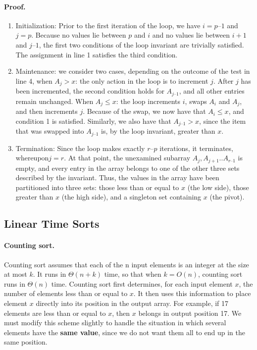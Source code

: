 \paragraph{Proof.}
\begin{enumerate}
  \item Initialization: Prior to the first iteration of the loop, we have $i = p – 1$ and $ j= p$. Because no values lie between $p$ and $i$ and no values lie between $i + 1$ and $j – 1$, the first two conditions of the loop invariant are trivially satisfied. The assignment in line 1 satisfies the third condition.
  \item Maintenance: we consider two cases, depending on the outcome of the test in line 4, when $A_{j} > x$: the only action in the loop is to increment $j$. After $j$  has been incremented, the second condition holds for $A_{j – 1}$, and all other entries remain unchanged. When $A_{j} \le x$: the loop increments $i$, swaps $A_{i}$ and $A_{j}$, and then increments $j$. Because of the swap, we now have that $A_{i} \le x$, and condition 1 is satisfied. Similarly, we also have that $A_{j – 1} > x$, since the item that was swapped into $A_{j – 1}$ is, by the loop invariant, greater than $x$.
  \item Termination: Since the loop makes exactly $r – p$ iterations, it terminates, whereupon$ j= r$. At that point, the unexamined subarray $A_{j}, A_{j+1}..  A_{r – 1}$ is empty, and every entry in the array belongs to one of the other three sets described by the invariant. Thus, the values in the array have been partitioned into three sets: those less than or equal to $x$ (the low side), those greater than $x$ (the high side), and a singleton set containing $x$ (the pivot).


\end{enumerate}



\subsection*{Linear Time Sorts}
\paragraph{ Counting sort.} Counting sort assumes that each of the n input elements is an integer at the size at most $k$. It runs in $\Theta \left(n + k\right)$ time, so that when $k = O(n)$, counting sort runs in $\Theta\left(n\right)$ time.
Counting sort first determines, for each input element $x$, the number of elements less than or equal to $x$. It then uses this information to place element $x$ directly into its position in the output array. For example, if 17 elements are less than or equal to $x$, then $x$ belongs in output position 17. We must modify this scheme slightly to handle the situation in which several elements have the \textbf{same value}, since we do not want them all to end up in the same position.


